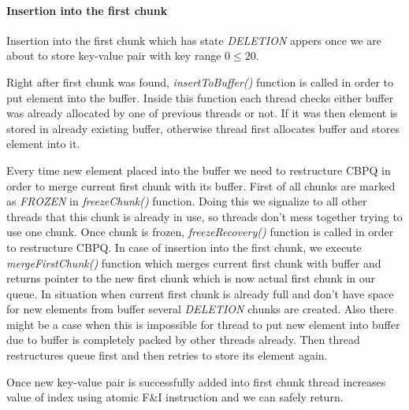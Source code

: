 \documentclass{article}
\begin{document}
\paragraph{Insertion into the first chunk}\mbox{}\par
Insertion into the first chunk which has state \emph{DELETION} appers once we are about to store key-value pair with key range $0 \leqslant 20$.\par
Right after first chunk was found, \textit{insertToBuffer()} function is called in order to put element into the buffer.
Inside this function each thread checks either buffer was already allocated by one of previous threads or not. If it was then element is stored in already existing buffer, otherwise thread first allocates buffer and stores element into it.\par
Every time new element placed into the buffer we need to restructure CBPQ in order to merge current first chunk with its buffer. First of all chunks are marked as \emph{FROZEN} in \textit{freezeChunk()} function. Doing this we signalize to all other threads that this chunk is already in use, so threads don't mess together trying to use one chunk. Once chunk is frozen, \textit{freezeRecovery()} function is called in order to restructure CBPQ. In case of insertion into the first chunk, we execute \textit{mergeFirstChunk()} function which merges current first chunk with buffer and returns pointer to the new first chunk which is now actual first chunk in our queue. In situation when current first chunk is already full and don't have space for new elements from buffer several \emph{DELETION} chunks are created. Also there might be a case when this is impossible for thread to put new element into buffer due to buffer is completely packed by other threads already. Then thread restructures queue first and then retries to store its element again.\par
Once new key-value pair is successfully added into first chunk thread increases value of index using atomic F\&I instruction and we can safely return.
\pagebreak
\end{document}
